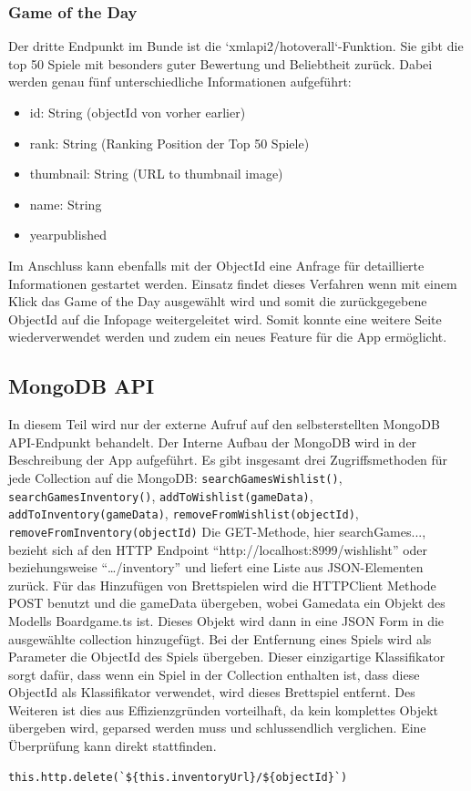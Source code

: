 \subsubsection{Game of the Day}
Der dritte Endpunkt im Bunde ist die `xmlapi2/hotoverall`-Funktion. Sie gibt die top 50 Spiele mit besonders guter Bewertung und Beliebtheit zurück.
Dabei werden genau fünf unterschiedliche Informationen aufgeführt:
\setlength{\itemsep}{-1pt}
\setlength{\parskip}{-1pt}
\begin{itemize}
    \item id: String (objectId von vorher earlier)
    \item rank: String (Ranking Position der Top 50 Spiele)
    \item thumbnail: String (URL to thumbnail image)
    \item name:  String        
    \item yearpublished 
\end{itemize}
Im Anschluss kann ebenfalls mit der ObjectId eine Anfrage für detaillierte Informationen gestartet werden. 
Einsatz findet dieses Verfahren wenn mit einem Klick das Game of the Day ausgewählt wird und somit die zurückgegebene ObjectId auf die Infopage
weitergeleitet wird. Somit konnte eine weitere Seite wiederverwendet werden und zudem ein neues Feature für die App ermöglicht. 
\subsection{MongoDB API}
In diesem Teil wird nur der externe Aufruf auf den selbsterstellten MongoDB API-Endpunkt behandelt. 
Der Interne Aufbau der MongoDB wird in der Beschreibung der App aufgeführt. Es gibt insgesamt drei Zugriffsmethoden für jede Collection auf die MongoDB: 
\texttt{searchGamesWishlist()},
\texttt{searchGamesInventory()},
\texttt{addToWishlist(gameData)},
\texttt{addToInventory(gameData)},
\texttt{removeFromWishlist(objectId)},
\texttt{removeFromInventory(objectId)}\bigskip
Die GET-Methode, hier searchGames..., bezieht sich af den HTTP Endpoint 
``http://localhost:8999/wishlisht'' oder beziehungsweise ``\ldots/inventory'' und liefert eine Liste aus JSON-Elementen zurück.
Für das Hinzufügen von Brettspielen wird die HTTPClient Methode POST benutzt und die gameData übergeben, wobei Gamedata ein Objekt des Modells Boardgame.ts ist. 
Dieses Objekt wird dann in eine JSON Form in die ausgewählte collection hinzugefügt. Bei der Entfernung eines Spiels wird als Parameter die ObjectId des Spiels übergeben.
Dieser einzigartige Klassifikator sorgt dafür, dass wenn ein Spiel in der Collection enthalten ist, dass diese ObjectId als Klassifikator verwendet, wird dieses Brettspiel entfernt.
Des Weiteren ist dies aus Effizienzgründen vorteilhaft, da kein komplettes Objekt übergeben wird, geparsed werden muss und schlussendlich verglichen. Eine Überprüfung kann direkt stattfinden.
\begin{center}
    \begin{lstlisting}[caption={Löschaufruf der MongoDB API}, label=lst:jscode]
    this.http.delete(`${this.inventoryUrl}/${objectId}`)
\end{lstlisting}
\end{center}


